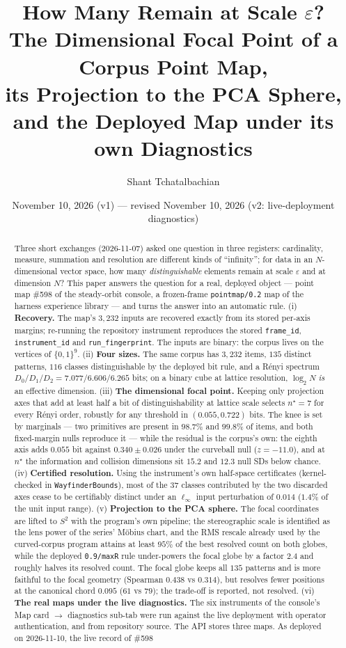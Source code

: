 \documentclass[11pt,a4paper]{article}
\title{How Many Remain at Scale $\varepsilon$?\\
{\large The Dimensional Focal Point of a Corpus Point Map,\\ its Projection to the PCA Sphere, and the Deployed Map under its own Diagnostics}}
\author{Shant Tchatalbachian}
\date{November 10, 2026 (v1) --- revised November 10, 2026 (v2: live-deployment diagnostics)}
\theoremstyle{plain}
\theoremstyle{remark}
\begin{document}
\maketitle

\begin{abstract}
Three short exchanges (2026-11-07) asked one question in three registers: cardinality, measure, summation and resolution are different kinds of ``infinity''; for data in an $N$-dimensional vector space, how many \emph{distinguishable} elements remain at scale $\varepsilon$ and at dimension $N$? This paper answers the question for a real, deployed object --- point map \#598 of the steady-orbit console, a frozen-frame \texttt{pointmap/0.2} map of the harness experience library --- and turns the answer into an automatic rule. (i) \textbf{Recovery.} The map's $3{,}232$ inputs are recovered exactly from its stored per-axis margins; re-running the repository instrument reproduces the stored \texttt{frame\_id}, \texttt{instrument\_id} and \texttt{run\_fingerprint}. The inputs are binary: the corpus lives on the vertices of $\{0,1\}^9$. (ii) \textbf{Four sizes.} The same corpus has $3{,}232$ items, $135$ distinct patterns, $116$ classes distinguishable by the deployed bit rule, and a Rényi spectrum $D_0/D_1/D_2=7.077/6.606/6.265$ bits; on a binary cube at lattice resolution, $\log_2 N$ \emph{is} an effective dimension. (iii) \textbf{The dimensional focal point.} Keeping only projection axes that add at least half a bit of distinguishability at lattice scale selects $n^\star=7$ for every Rényi order, robustly for any threshold in $(0.055,0.722)$ bits. The knee is set by marginals --- two primitives are present in $98.7\%$ and $99.8\%$ of items, and both fixed-margin nulls reproduce it --- while the residual is the corpus's own: the eighth axis adds $0.055$ bit against $0.340\pm0.026$ under the curveball null ($z=-11.0$), and at $n^\star$ the information and collision dimensions sit $15.2$ and $12.3$ null SDs below chance. (iv) \textbf{Certified resolution.} Using the instrument's own half-space certificates (kernel-checked in \texttt{WayfinderBounds}), most of the $37$ classes contributed by the two discarded axes cease to be certifiably distinct under an $\ell_\infty$ input perturbation of $0.014$ ($1.4\%$ of the unit input range). (v) \textbf{Projection to the PCA sphere.} The focal coordinates are lifted to $S^2$ with the program's own pipeline; the stereographic scale is identified as the lens power of the series' Möbius chart, and the RMS rescale already used by the curved-corpus program attains at least $95\%$ of the best resolved count on both globes, while the deployed \texttt{0.9/maxR} rule under-powers the focal globe by a factor $2.4$ and roughly halves its resolved count. The focal globe keeps all $135$ patterns and is more faithful to the focal geometry (Spearman $0.438$ vs $0.314$), but resolves fewer positions at the canonical chord $0.095$ ($61$ vs $79$); the trade-off is reported, not resolved. (vi) \textbf{The real maps under the live diagnostics.} The six instruments of the console's Map card $\to$ diagnostics sub-tab were run against the live deployment with operator authentication, and from repository source. The API stores three maps. As deployed on 2026-11-10, the live record of \#598 
\end{abstract}
\end{document}

